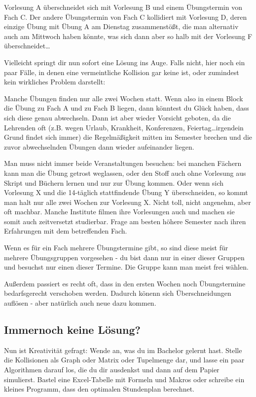 Vorlesung A überschneidet sich mit Vorlesung B und einem Übungstermin von Fach C. Der andere Übungstermin von Fach C kollidiert mit Vorlesung D, deren einzige Übung mit Übung A am Dienstag zusammenstößt, die man alternativ auch am Mittwoch haben könnte, was sich dann aber so halb mit der Vorlesung F überschneidet\ldots

Vielleicht springt dir nun sofort eine Lösung ins Auge. Falls nicht, hier noch ein paar Fälle, in denen eine vermeintliche Kollision gar keine ist, oder zumindest kein wirkliches Problem darstellt:

Manche Übungen finden nur alle zwei Wochen statt. Wenn also in einem Block die Übung zu Fach A und zu Fach B liegen, dann könntest du Glück haben, dass sich diese genau abwechseln. Dann ist aber wieder Vorsicht geboten, da die Lehrenden oft (z.B. wegen Urlaub, Krankheit, Konferenzen, Feiertag\ldots irgendein Grund findet sich immer) die Regelmäßigkeit mitten im Semester brechen und die zuvor abwechselnden Übungen dann wieder aufeinander liegen.

Man muss nicht immer beide Veranstaltungen besuchen: bei manchen Fächern kann man die Übung getrost weglassen, oder den Stoff auch ohne Vorlesung aus Skript und Büchern lernen und nur zur Übung kommen. Oder wenn sich Vorlesung X und die 14-täglich stattfindende Übung Y überschneiden, so kommt man halt nur alle zwei Wochen zur Vorlesung X. Nicht toll, nicht angenehm, aber oft machbar. Manche Institute filmen ihre Vorlesungen auch und machen sie somit auch zeitversetzt studierbar. Frage am besten höhere Semester nach ihren Erfahrungen mit dem betreffenden Fach.

Wenn es für ein Fach mehrere Übungstermine gibt, so sind diese meist für mehrere Übungsgruppen vorgesehen - du bist dann nur in einer dieser Gruppen und besuchst nur einen dieser Termine. Die Gruppe kann man meist frei wählen.

Außerdem passiert es recht oft, dass in den ersten Wochen noch Übungstermine bedarfsgerecht verschoben werden. Dadurch könenn sich Überschneidungen auflösen - aber natürlich auch neue dazu kommen.

\subsection{Immernoch keine Lösung?}
Nun ist Kreativität gefragt: Wende an, was du im Bachelor gelernt hast. Stelle die Kollisionen als Graph oder Matrix oder Tupelmenge dar, und lasse ein paar Algorithmen darauf los, die du dir ausdenkst und dann auf dem Papier simulierst. Bastel eine Excel-Tabelle mit Formeln und Makros oder schreibe ein kleines Programm, dass den optimalen Stundenplan berechnet. 

